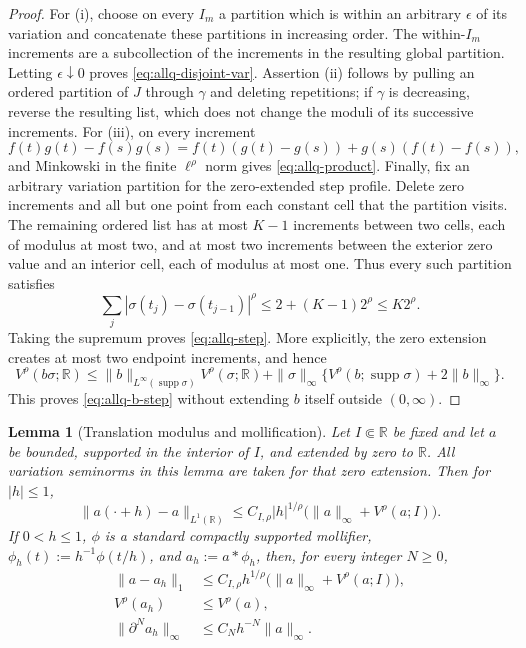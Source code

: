 \documentclass[11pt]{article}
\numberwithin{equation}{section}
\newtheorem{lemma}[theorem]{Lemma}
\theoremstyle{remark}
\theoremstyle{definition}
\newcommand{\R}{\mathbb R}
\newcommand{\supp}{\operatorname{supp}}
\begin{document}
\begin{proof}
For (i), choose on every $I_m$ a partition which is within an arbitrary
$\epsilon$ of its variation and concatenate these partitions in increasing
order.  The within-$I_m$ increments are a subcollection of the increments in
the resulting global partition.  Letting $\epsilon\downarrow0$ proves
\eqref{eq:allq-disjoint-var}.  Assertion (ii) follows by pulling an ordered
partition of $J$ through $\gamma$ and deleting repetitions; if $\gamma$ is
decreasing, reverse the resulting list, which does not change the moduli of
its successive increments.  For (iii), on
every increment
\[
 f(t)g(t)-f(s)g(s)
 =f(t)(g(t)-g(s))+g(s)(f(t)-f(s)),
\]
and Minkowski in the finite $\ell^\rho$ norm gives
\eqref{eq:allq-product}.  Finally, fix an arbitrary variation partition
for the zero-extended step profile.  Delete zero increments and all but one
point from each constant cell that the partition visits.  The remaining
ordered list has at most $K-1$ increments between two cells, each of modulus
at most two, and at most two increments between the exterior zero value and
an interior cell, each of modulus at most one.  Thus every such partition
satisfies
\[
 \sum_j|\sigma(t_j)-\sigma(t_{j-1})|^\rho
 \le 2+(K-1)2^\rho\le K2^\rho.
\]
Taking the supremum proves \eqref{eq:allq-step}.  More explicitly, the zero extension
creates at most two endpoint increments, and hence
\[
 V^\rho(b\sigma;\mathbb R)
 \le \|b\|_{L^\infty(\supp\sigma)}V^\rho(\sigma;\mathbb R)
 +\|\sigma\|_\infty
  \{V^\rho(b;\supp\sigma)+2\|b\|_\infty\}.
\]
This proves \eqref{eq:allq-b-step} without extending $b$ itself outside
$(0,\infty)$.
\end{proof}

\begin{lemma}[Translation modulus and mollification]
\label{lem:allq-translation}
Let $I\Subset\R$ be fixed and let $a$ be bounded, supported in the
interior of $I$, and extended by zero to $\R$.  All variation seminorms in
this lemma are taken for that zero extension.  Then for $|h|\le1$,
\begin{equation}\label{eq:allq-translation}
 \|a(\cdot+h)-a\|_{L^1(\R)}
 \le C_{I,\rho}|h|^{1/\rho}
 \bigl(\|a\|_\infty+V^\rho(a;I)\bigr).
\end{equation}
If $0<h\le1$, $\phi$ is a standard compactly supported mollifier,
$\phi_h(t):=h^{-1}\phi(t/h)$, and $a_h:=a*\phi_h$, then, for every
integer $N\ge0$,
\begin{align}
 \|a-a_h\|_1
 &\le C_{I,\rho}h^{1/\rho}
  \bigl(\|a\|_\infty+V^\rho(a;I)\bigr),
 \label{eq:allq-moll-L1}\\
 V^\rho(a_h)&\le V^\rho(a),
 \label{eq:allq-moll-var}\\
 \|\partial^Na_h\|_\infty&\le C_Nh^{-N}\|a\|_\infty.
 \label{eq:allq-moll-derivative}
\end{align}
\end{lemma}
\end{document}
